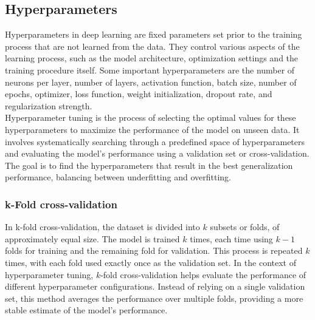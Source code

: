 \subsection{Hyperparameters}\label{section:hyperparameters}
Hyperparameters in deep learning are fixed parameters set prior to the training process that are not learned from the data. They control various aspects of the learning process, such as the model architecture, optimization settings and the training procedure itself. Some important hyperparameters are the number of neurons per layer, number of layers, activation function, batch size, number of epochs, optimizer, loss function, weight initialization, dropout rate, and regularization strength. \\
Hyperparameter tuning is the process of selecting the optimal values for these hyperparameters to maximize the performance of the model on unseen data. It involves systematically searching through a predefined space of hyperparameters and evaluating the model's performance using a validation set or cross-validation. The goal is to find the hyperparameters that result in the best generalization performance, balancing between underfitting and overfitting.
\subsubsection{k-Fold cross-validation}
In k-fold cross-validation, the dataset is divided into $k$ subsets or folds, of approximately equal size. The model is trained $k$ times, each time using $k-1$ folds for training and the remaining fold for validation. This process is repeated $k$ times, with each fold used exactly once as the validation set. In the context of hyperparameter tuning, $k$-fold cross-validation helps evaluate the performance of different hyperparameter configurations. Instead of relying on a single validation set, this method averages the performance over multiple folds, providing a more stable estimate of the model's performance.
